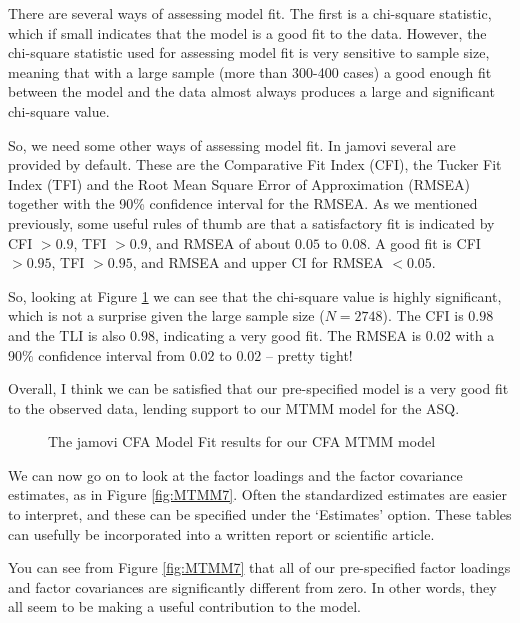 There are several ways of assessing model fit. The first is a chi-square statistic, which if small indicates that the model is a good fit to the data. However, the chi-square statistic used for assessing model fit is very sensitive to sample size, meaning that with a large sample (more than 300-400 cases) a good enough fit between the model and the data almost always produces a large and significant chi-square value. 

So, we need some other ways of assessing model fit. In jamovi several are provided by default. These are the Comparative Fit Index (CFI), the Tucker Fit Index (TFI) and the Root Mean Square Error of Approximation (RMSEA) together with the 90\% confidence interval for the RMSEA. As we mentioned previously, some useful rules of thumb are that a satisfactory fit is indicated by CFI $>0.9$, TFI $>0.9$, and RMSEA of about $0.05$ to $0.08$. A good fit is CFI $>0.95$, TFI $>0.95$, and RMSEA and upper CI for RMSEA $<0.05$. 

So, looking at Figure \ref{fig:MTMM6} we can see that the chi-square value is highly significant, which is not a surprise given the large sample size ($N=2748$). The CFI is $0.98$ and the TLI is also $0.98$, indicating a very good fit. The RMSEA is $0.02$ with a 90\% confidence interval from $0.02$ to $0.02$ – pretty tight! 

Overall, I think we can be satisfied that our pre-specified model is a very good fit to the observed data, lending support to our MTMM model for the ASQ.

\begin{figure}[!htb]
\begin{center}
\caption{The jamovi CFA Model Fit results for our CFA MTMM model}
\label{fig:MTMM6}
\HR
\end{center}
\end{figure}

We can now go on to look at the factor loadings and the factor covariance estimates, as in Figure \ref{fig:MTMM7}. Often the standardized estimates are easier to interpret, and these can be specified under the ‘Estimates’ option. These tables can usefully be incorporated into a written report or scientific article.

You can see from Figure \ref{fig:MTMM7} that all of our pre-specified factor loadings and factor covariances are significantly different from zero. In other words, they all seem to be making a useful contribution to the model.

